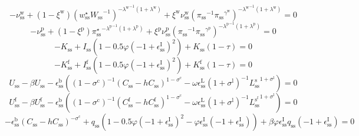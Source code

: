 \begin{equation}
-\nu^{\mathrm{w}}_\mathrm{ss} + \left(1 - \xi^{\mathrm{w}}\right) {\left({w^{\star}_\mathrm{ss}} {W_\mathrm{ss}}^{-1}\right)^{-{\lambda^{\mathrm{w}}}^{-1} \left(1 + \lambda^{\mathrm{w}}\right)}} + {\xi^{\mathrm{w}}} {\nu^{\mathrm{w}}_\mathrm{ss}} {\left({\pi_\mathrm{ss}}^{-1} {{\pi_\mathrm{ss}}^{\gamma^{\mathrm{w}}}}\right)^{-{\lambda^{\mathrm{w}}}^{-1} \left(1 + \lambda^{\mathrm{w}}\right)}} = 0
\end{equation}
\begin{equation}
-\nu^{\mathrm{p}}_\mathrm{ss} + \left(1 - \xi^{\mathrm{p}}\right) {{\pi^{\star}_\mathrm{ss}}^{-{\lambda^{\mathrm{p}}}^{-1} \left(1 + \lambda^{\mathrm{p}}\right)}} + {\xi^{\mathrm{p}}} {\nu^{\mathrm{p}}_\mathrm{ss}} {\left({\pi_\mathrm{ss}}^{-1} {{\pi_\mathrm{ss}}^{\gamma^{\mathrm{p}}}}\right)^{-{\lambda^{\mathrm{p}}}^{-1} \left(1 + \lambda^{\mathrm{p}}\right)}} = 0
\end{equation}
\begin{equation}
-K_\mathrm{ss} + {I_\mathrm{ss}} \left(1 - 0.5{\varphi} \left(-1 + \epsilon^{\mathrm{I}}_\mathrm{ss}\right)^{2}\right) + {K_\mathrm{ss}} \left(1 - \tau\right) = 0
\end{equation}
\begin{equation}
-K^{\mathrm{f}}_\mathrm{ss} + {I^{\mathrm{f}}_\mathrm{ss}} \left(1 - 0.5{\varphi} \left(-1 + \epsilon^{\mathrm{I}}_\mathrm{ss}\right)^{2}\right) + {K^{\mathrm{f}}_\mathrm{ss}} \left(1 - \tau\right) = 0
\end{equation}
\begin{equation}
U_\mathrm{ss} - {\beta} {U_\mathrm{ss}} - {\epsilon^{\mathrm{b}}_\mathrm{ss}} \left(\left(1 - \sigma^{\mathrm{c}}\right)^{-1} {\left(C_\mathrm{ss} - {h} {C_\mathrm{ss}}\right)^{1 - \sigma^{\mathrm{c}}}} - {\omega} {\epsilon^{\mathrm{L}}_\mathrm{ss}} \left(1 + \sigma^{\mathrm{l}}\right)^{-1} {{L^{\mathrm{s}}_\mathrm{ss}}^{1 + \sigma^{\mathrm{l}}}}\right) = 0
\end{equation}
\begin{equation}
U^{\mathrm{f}}_\mathrm{ss} - {\beta} {U^{\mathrm{f}}_\mathrm{ss}} - {\epsilon^{\mathrm{b}}_\mathrm{ss}} \left(\left(1 - \sigma^{\mathrm{c}}\right)^{-1} {\left(C^{\mathrm{f}}_\mathrm{ss} - {h} {C^{\mathrm{f}}_\mathrm{ss}}\right)^{1 - \sigma^{\mathrm{c}}}} - {\omega} {\epsilon^{\mathrm{L}}_\mathrm{ss}} \left(1 + \sigma^{\mathrm{l}}\right)^{-1} {{L^{\mathrm{s}^{\mathrm{f}}}_\mathrm{ss}}^{1 + \sigma^{\mathrm{l}}}}\right) = 0
\end{equation}
\begin{equation}
-{\epsilon^{\mathrm{b}}_\mathrm{ss}} {\left(C_\mathrm{ss} - {h} {C_\mathrm{ss}}\right)^{-\sigma^{\mathrm{c}}}} + {q_\mathrm{ss}} \left(1 - 0.5{\varphi} \left(-1 + \epsilon^{\mathrm{I}}_\mathrm{ss}\right)^{2} - {\varphi} {\epsilon^{\mathrm{I}}_\mathrm{ss}} \left(-1 + \epsilon^{\mathrm{I}}_\mathrm{ss}\right)\right) + {\beta} {\varphi} {\epsilon^{\mathrm{I}}_\mathrm{ss}} {q_\mathrm{ss}} \left(-1 + \epsilon^{\mathrm{I}}_\mathrm{ss}\right) = 0
\end{equation}
